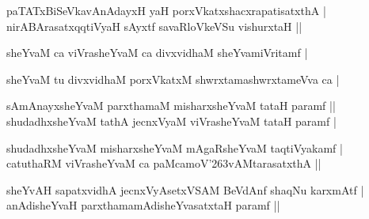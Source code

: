 \begin{entry}
\begin{shl}
paTATxBiSeVkavAnAdayxH yaH porxVkatxshacxrapatisatxthA |\\[2pt]
nirABArasatxqqtiVyaH sAyxtf savaRloVkeVSu vishurxtaH ||\\[-1pt]
\end{shl}
\medskip
{}
\smallskip
{}
\medskip
{}
\medskip
\begin{shl}
sheYvaM ca viVrasheYvaM ca divxvidhaM sheYvamiVritamf |\\[-1pt]
\end{shl}
\medskip
{}
\medskip
{}
\medskip
\begin{shl}
sheYvaM tu divxvidhaM porxVkatxM shwrxtamashwrxtameVva ca |\\[-1pt]
\end{shl}
\medskip
{}
\medskip
{}
\medskip
\begin{shl}
sAmAnayxsheYvaM parxthamaM misharxsheYvaM tataH paramf ||\\[2pt]
shudadhxsheYvaM tathA jecnxVyaM viVrasheYvaM tataH paramf |\\[-1pt]
\end{shl}
\medskip
{}
\medskip
{}
\medskip
\begin{shl}
shudadhxsheYvaM misharxsheYvaM mAgaRsheYvaM taqtiVyakamf |\\[2pt]
catuthaRM viVrasheYvaM ca paMcamoV{\char'263}vAMtarasatxthA ||\\[-1pt]
\end{shl}
\medskip
{}
\medskip
{}
\medskip
\begin{shl}
sheYvAH sapatxvidhA jecnxVyAsetxVSAM BeVdAnf shaqNu karxmAtf |\\[2pt]
anAdisheYvaH parxthamamAdisheYvasatxtaH paramf ||\\[2pt]

\end{shl}
\end{entry}
